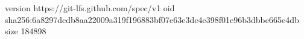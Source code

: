 version https://git-lfs.github.com/spec/v1
oid sha256:6a8297dcdb8aa22009a319f196883bf07e63e3dc4e398f01e96b3dbbe665e4db
size 184898
